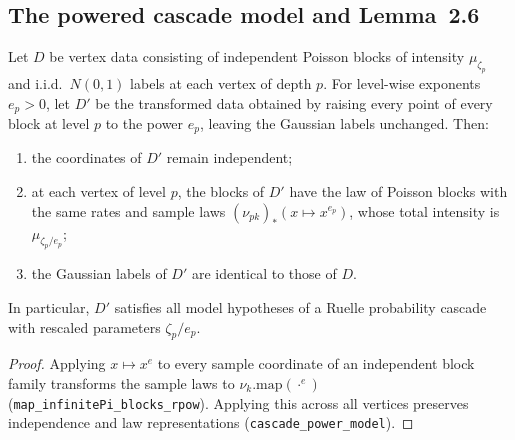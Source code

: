 \subsection*{The powered cascade model and Lemma~2.6}

\begin{theorem}\label{thm:sg:power-model}
  \leanok
Let $D$ be vertex data consisting of independent Poisson blocks of intensity $\mu_{\zeta_p}$ and i.i.d.\ $N(0,1)$ labels at each vertex of depth $p$. For level-wise exponents $e_p > 0$, let $D'$ be the transformed data obtained by raising every point of every block at level $p$ to the power $e_p$, leaving the Gaussian labels unchanged. Then:
\begin{enumerate}
\item the coordinates of $D'$ remain independent;
\item at each vertex of level $p$, the blocks of $D'$ have the law of Poisson blocks with the same rates and sample laws $(\nu_{pk})_*(x \mapsto x^{e_p})$, whose total intensity is $\mu_{\zeta_p / e_p}$;
\item the Gaussian labels of $D'$ are identical to those of $D$.
\end{enumerate}
In particular, $D'$ satisfies all model hypotheses of a Ruelle probability cascade with rescaled parameters $\zeta_p / e_p$.
\end{theorem}
\begin{proof}
  \leanok
Applying $x \mapsto x^e$ to every sample coordinate of an independent block family transforms the sample laws to $\nu_k.\mathrm{map}(\cdot^e)$ (\texttt{map\_infinitePi\_blocks\_rpow}). Applying this across all vertices preserves independence and law representations (\texttt{cascade\_power\_model}).
\end{proof}

